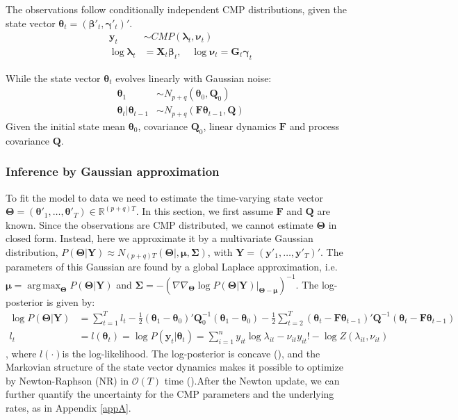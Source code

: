 \documentclass[aoas]{imsart}
\DeclareMathOperator*{\argmax}{arg\,max}
\theoremstyle{plain}
\theoremstyle{remark}
\begin{document}
The observations follow conditionally independent CMP distributions, given the state vector $\bm{\theta}_t = (\bm{\beta}'_t, \bm{\gamma}'_t)'$. 
\begin{align}
	\bm{y}_t &\sim CMP(\bm{\lambda}_t, \bm{\nu}_t)\\
	\log\bm{\lambda}_t &= \bm{X}_t\bm{\beta}_t, \quad \log\bm{\nu}_t = \bm{G}_t\bm{\gamma}_t \nonumber
\end{align}

While the state vector  $\bm{\theta}_t$ evolves linearly with Gaussian noise:
\begin{align}
	\bm{\theta}_1 &\sim N_{p+q}(\bm{\theta}_0, \bm{Q}_0)\\
	\bm{\theta}_t|\bm{\theta}_{t-1} &\sim N_{p+q}(\bm{F\theta}_{t-1}, \bm{Q}) \nonumber
\end{align}
Given the initial state mean $\bm{\theta}_0$, covariance $\bm{Q}_0$, linear dynamics $\bm{F}$ and process covariance $\bm{Q}$.

\subsubsection{Inference by Gaussian approximation}
To fit the model to data we need to estimate the time-varying state vector $\bm{\Theta} = (\bm{\theta}'_1,\ldots,\bm{\theta}'_T)\in\mathbb{R}^{(p+q)T}$. In this section, we first assume $\bm{F}$ and $\bm{Q}$ are known. Since the observations are CMP distributed, we cannot estimate $\bm{\Theta}$ in closed form. Instead, here we approximate it by a multivariate Gaussian distribution, $P(\bm{\Theta|Y}) \approx N_{(p+q)T}(\bm{\Theta|,\mu,\Sigma})$, with $\bm{Y} = (\bm{y}'_1,\ldots, \bm{y}'_T)'$. The parameters of this Gaussian are found by a global Laplace approximation, i.e. $\bm{\mu} = \argmax_{\bm{\Theta}}P(\bm{\Theta|Y})$ and $\bm{\Sigma} = -(\nabla\nabla_{\bm{\Theta}}\log P(\bm{\Theta|Y})|_{\bm{\Theta - \mu}})^{-1}$. The log-posterior is given by:
\begin{align}
	\log P(\bm{\Theta|Y}) &= \sum_{t=1}^{T}l_t - \frac{1}{2}(\bm{\theta}_1 - \bm{\theta}_0)'\bm{Q}_0^{-1}(\bm{\theta}_1 - \bm{\theta}_0) - \frac{1}{2}\sum_{t=2}^{T}(\bm{\theta}_t - \bm{F\theta}_{t-1})'\bm{Q}^{-1}(\bm{\theta}_t - \bm{F\theta}_{t-1})\\
	l_t &= l(\bm{\theta}_t) = \log P(\bm{y}_t|\bm{\theta}_t) = \sum_{i=1}^{n}y_{it}\log \lambda_{it} - \nu_{it}y_{it}! - \log Z(\lambda_{it}, \nu_{it}) \nonumber
\end{align}
, where $l(\cdot)$is the log-likelihood. The log-posterior is concave (\cite{Gupta2014}), and the Markovian structure of the state vector dynamics makes it possible to optimize by Newton-Raphson (NR) in $\mathcal{O}(T)$ time (\cite{Paninski2010}).After the Newton update, we can further quantify the uncertainty for the CMP parameters and the underlying rates, as in Appendix \ref{appA}.
\end{document}
